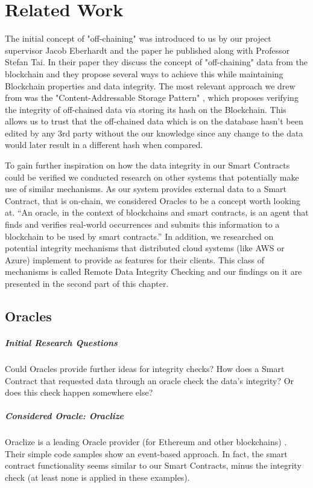 \section{Related Work}

The initial concept of "off-chaining" was introduced to us by our project supervisor Jacob Eberhardt and the paper he published along with Professor Stefan Tai.
In their paper they discuss the concept of "off-chaining" data from the blockchain and they propose several ways to achieve this while maintaining Blockchain properties and data integrity. The most relevant approach we drew from was the "Content-Addressable Storage Pattern" \cite{Eberhardt2017}, which proposes verifying the integrity of off-chained data via storing its hash on the Blockchain. This allows us to trust that the off-chained data which is on the database hasn't been edited by any 3rd party without the our knowledge since any change to the data would later result in a different hash when compared\cite{Eberhardt2017}.

To gain further inspiration on how the data integrity in our Smart Contracts could be verified we conducted research on other systems that potentially make use of similar mechanisms. As our system provides external data to a Smart Contract, that is on-chain, we considered Oracles to be a concept worth looking at. “An oracle, in the context of blockchains and smart contracts, is an agent that finds and verifies real-world occurrences and submits this information to a blockchain to be used by smart contracts.” \cite{relatedWork01} In addition, we researched on potential integrity mechanisms that distributed cloud systems (like AWS or Azure) implement to provide as features for their clients. This class of mechanisms is called Remote Data Integrity Checking and our findings on it are presented in the second part of this chapter.

\subsection{Oracles}

\subparagraph{Initial Research Questions}
Could Oracles provide further ideas for integrity checks? How does a Smart Contract that requested data through an oracle check the data’s integrity? Or does this check happen somewhere else?

\subparagraph{Considered Oracle: Oraclize}
Oraclize is a leading Oracle provider (for Ethereum and other blockchains) \cite{relatedWork02}. Their simple code samples \cite{relatedWork03} show an event-based approach. In fact, the smart contract functionality seems similar to our Smart Contracts, minus the integrity check (at least none is applied in these examples).

